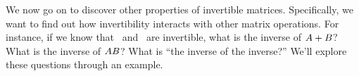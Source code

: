 We now go on to discover other properties of invertible matrices. Specifically, we want to find out how invertibility interacts with other matrix operations. For instance, if we know that \tta\ and \ttb\ are invertible, what is the inverse of $A+B$? What is the inverse of $AB$? What is ``the inverse of the inverse?'' We'll explore these questions through an example.\\


